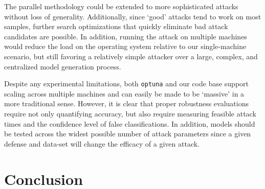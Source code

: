 \documentclass[fonts]{icst}
\begin{document}
The parallel methodology could be extended to more sophisticated attacks without loss of generality.
Additionally, since `good' attacks tend to work on most samples, further search optimizations that quickly eliminate bad attack candidates are possible.
In addition, running the attack on multiple machines would reduce the load on the operating system relative to our single-machine scenario, but still favoring a relatively simple attacker over a large, complex, and centralized model generation process.

Despite any experimental limitations, both \texttt{optuna} and our code base support scaling across multiple machines and can easily be made to be `massive' in a more traditional sense.
However, it is clear that proper robustness evaluations require not only quantifying accuracy, but also require measuring feasible attack times and the confidence level of false classifications.
In addition, models should be tested across the widest possible number of attack parameters since a given defense and data-set will change the efficacy of a given attack.


\section{Conclusion}
\end{document}
